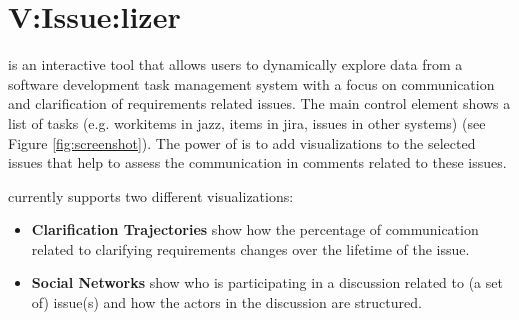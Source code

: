 \section{V:Issue:lizer}
\viss is an interactive tool that allows users to dynamically explore data from a software development task management system with a focus on communication and clarification of requirements related issues.
The main control element shows a list of tasks (e.g. workitems in jazz, items in jira, issues in other systems) (see Figure \ref{fig:screenshot}).
The power of \viss is to add visualizations to the selected issues that help to assess the communication in comments related to these issues.

\viss currently supports two different visualizations: 
\begin{itemize}
\item \textbf{Clarification Trajectories} show how the percentage of communication related to clarifying requirements changes over the lifetime of the issue.
\item \textbf{Social Networks} show who is participating in a discussion related to (a set of) issue(s) and how the actors in the discussion are structured. 
\end{itemize} 